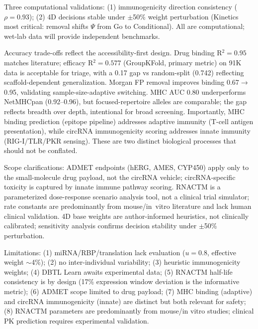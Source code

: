 Three computational validations: (1) immunogenicity direction consistency ($\rho{=}0.93$); (2) 4D decisions stable under ${\pm}$50\% weight perturbation (Kinetics most critical: removal shifts $\Psi$ from Go to Conditional). All are computational; wet-lab data will provide independent benchmarks.

Accuracy trade-offs reflect the accessibility-first design. Drug binding R$^2{=}0.95$ matches literature; efficacy R$^2{=}0.577$ (GroupKFold, primary metric) on 91K data is acceptable for triage, with a 0.17 gap vs random-split (0.742) reflecting scaffold-dependent generalization. Morgan FP removal improves binding 0.67$\to$0.95, validating sample-size-adaptive switching. MHC AUC 0.80 underperforms NetMHCpan (0.92--0.96), but focused-repertoire alleles are comparable; the gap reflects breadth over depth, intentional for broad screening. Importantly, MHC binding prediction (epitope pipeline) addresses adaptive immunity (T-cell antigen presentation), while circRNA immunogenicity scoring addresses innate immunity (RIG-I/TLR/PKR sensing). These are two distinct biological processes that should not be conflated.

Scope clarifications: ADMET endpoints (hERG, AMES, CYP450) apply only to the small-molecule drug payload, not the circRNA vehicle; circRNA-specific toxicity is captured by innate immune pathway scoring. RNACTM is a parameterized dose-response scenario analysis tool, not a clinical trial simulator; rate constants are predominantly from mouse/in~vitro literature and lack human clinical validation. 4D base weights are author-informed heuristics, not clinically calibrated; sensitivity analysis confirms decision stability under $\pm$50\% perturbation.

Limitations: (1) miRNA/RBP/translation lack evaluation ($u{=}0.8$, effective weight ${\sim}$4\%); (2) no inter-individual variability; (3) heuristic immunogenicity weights; (4) DBTL Learn awaits experimental data; (5) RNACTM half-life consistency is by design (17\% expression window deviation is the informative metric); (6) ADMET scope limited to drug payload; (7) MHC binding (adaptive) and circRNA immunogenicity (innate) are distinct but both relevant for safety; (8) RNACTM parameters are predominantly from mouse/in vitro studies; clinical PK prediction requires experimental validation.